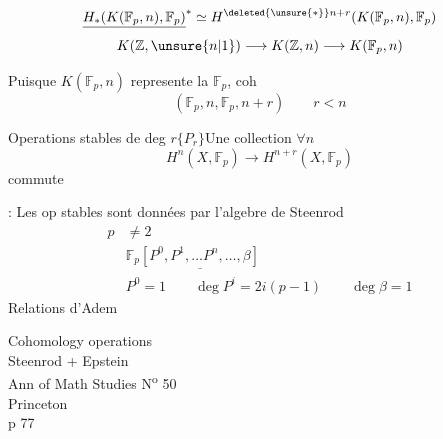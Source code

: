 \[
\underline{H_{*}(K(\mathbb F_p,n),\mathbb F_p)}^{*}
\simeq H^{\deleted{\unsure{*}}n+r}(K(\mathbb F_p,n),\mathbb F_p)
\]
\[
K(\mathbb Z,\unsure{n|1})\longrightarrow K(\mathbb Z,n)\longrightarrow K(\mathbb F_p,n)
\]

Puisque $K(\mathbb F_p,n)$ represente la $\mathbb F_p$, coh
\[
(\mathbb F_p,n,\mathbb F_p,n+r)
\qquad r<n
\]

Operations stables de deg $r$\quad $\{P_{r}\}$\quad Une collection $\forall n$
\[
H^n(X,\mathbb F_p)\longrightarrow H^{n+r}(X,\mathbb F_p)
\]
commute

 : Les op stables sont  données par l'algebre de Steenrod
\[
\begin{aligned}
p&\ne2\\
&\mathbb F_p\underline{[P^0,P^1,\ldots P^n,\ldots,\beta]}\\
&P^0=1\qquad\deg P^i=2i(p-1)\qquad\deg\beta=1
\end{aligned}
\]
Relations d'Adem

\noindent Cohomology operations\\
Steenrod + Epstein\\
Ann of Math Studies N\textsuperscript{o} 50\\
Princeton\\
p 77
